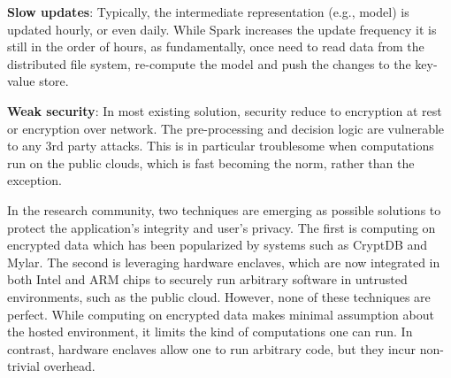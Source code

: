 {\bf Slow updates}: Typically, the intermediate representation (e.g., model) is updated hourly, or even daily. While Spark increases the update frequency it is still in the order of hours, as fundamentally, once need to read data from the distributed file system, re-compute the model and push the changes to the key-value store.

{\bf Weak security}: In most existing solution, security reduce to encryption at rest or encryption over network. The pre-processing and decision logic are vulnerable to any 3rd party attacks. This is in particular troublesome when computations run on the public clouds, which is fast becoming the norm, rather than the exception. 

In the research community, two techniques are emerging as possible solutions to protect the application's integrity and user's privacy. The first is computing on encrypted data which has been popularized by systems such as CryptDB and Mylar. The second is leveraging hardware enclaves, which are now integrated in both Intel and ARM chips to securely run arbitrary software in untrusted environments, such as the public cloud. However, none of these techniques are perfect. While computing on encrypted data makes minimal assumption about the hosted environment, it limits the kind of computations one can run. In contrast, hardware enclaves allow one to run arbitrary code, but they incur non-trivial overhead.  
